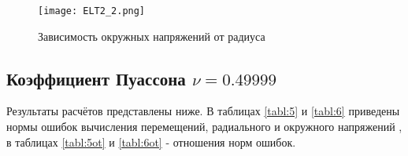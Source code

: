 \documentclass[a4paper,14pt]{extarticle}
\begin{document}
\begin{figure}[h]
\begin{center}
\texttt{[image: ELT2\_2.png]}
\caption{Зависимость окружных напряжений от радиуса}
\label{2t}
\end{center}
\end{figure}

\newpage

\subsection{Коэффициент Пуассона $\nu=0.49999$}
	
Результаты расчётов представлены ниже. В таблицах \ref{tabl:5} и \ref{tabl:6} приведены нормы ошибок вычисления перемещений, радиального и окружного напряжений , в таблицах \ref{tabl:5ot} и \ref{tabl:6ot} - отношения норм ошибок.
\end{document}
